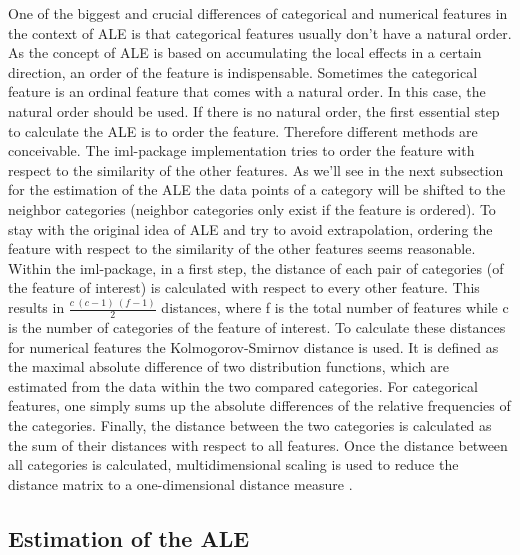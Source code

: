 \documentclass[]{krantz}
\begin{document}
One of the biggest and crucial differences of categorical and numerical
features in the context of ALE is that categorical features usually
don't have a natural order. As the concept of ALE is based on
accumulating the local effects in a certain direction, an order of the
feature is indispensable. Sometimes the categorical feature is an
ordinal feature that comes with a natural order. In this case, the
natural order should be used. If there is no natural order, the first
essential step to calculate the ALE is to order the feature. Therefore
different methods are conceivable. The iml-package implementation tries
to order the feature with respect to the similarity of the other
features. As we'll see in the next subsection for the estimation of the
ALE the data points of a category will be shifted to the neighbor
categories (neighbor categories only exist if the feature is ordered).
To stay with the original idea of ALE and try to avoid extrapolation,
ordering the feature with respect to the similarity of the other
features seems reasonable. Within the iml-package, in a first step, the
distance of each pair of categories (of the feature of interest) is
calculated with respect to every other feature. This results in
\(\frac{c~(c-1)~(f-1)}{2}\) distances, where f is the total number of
features while c is the number of categories of the feature of interest.
To calculate these distances for numerical features the
Kolmogorov-Smirnov distance is used. It is defined as the maximal
absolute difference of two distribution functions, which are estimated
from the data within the two compared categories. For categorical
features, one simply sums up the absolute differences of the relative
frequencies of the categories. Finally, the distance between the two
categories is calculated as the sum of their distances with respect to
all features. Once the distance between all categories is calculated,
multidimensional scaling is used to reduce the distance matrix to a
one-dimensional distance measure \citep{molnar2019}.

\subsection{Estimation of the ALE}\label{estimation-of-the-ale}
\end{document}
